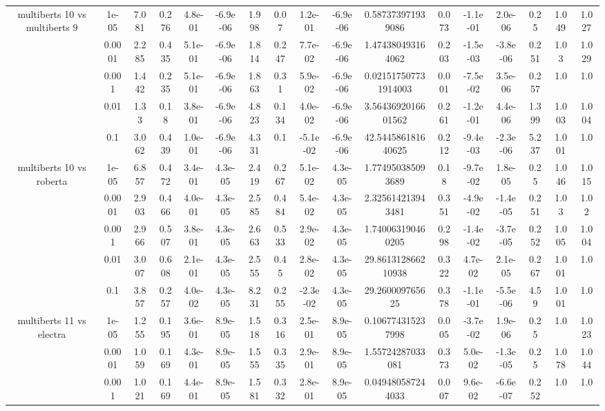 \begin{tabular}{|c|c|c|c|c|c|c|c|c|c|c|c|c|c|c|c|c|}
\hline
\multirow{5}{*}{multiberts 10 vs multiberts 9} & 1e-05 & 7.081 & 0.276 & 4.8e-01 & -6.9e-06 & 1.998 & 0.07 & 1.2e-01 & -6.9e-06 & 0.587373971939086 & 0.073 & -1.1e-01 & 2.0e-06 & 0.25 & 1.049 & 1.027 \\
 & 0.0001 & 2.285 & 0.435 & 5.1e-01 & -6.9e-06 & 1.814 & 0.247 & 7.7e-02 & -6.9e-06 & 1.474380493164062 & 0.203 & -1.5e-03 & -3.8e-06 & 0.251 & 1.03 & 1.029 \\
 & 0.001 & 1.442 & 0.235 & 5.1e-01 & -6.9e-06 & 1.863 & 0.31 & 5.9e-02 & -6.9e-06 & 0.021517507731914003 & 0.001 & -7.5e-02 & 3.5e-06 & 0.257 & 1.0 & 1.0 \\
 & 0.01 & 1.33 & 0.18 & 3.8e-01 & -6.9e-06 & 4.823 & 0.134 & 4.0e-02 & -6.9e-06 & 3.5643692016601562 & 0.261 & -1.2e-01 & 4.4e-06 & 1.399 & 1.003 & 1.004 \\
 & 0.1 & 3.062 & 0.439 & 1.0e-01 & -6.9e-06 & 4.331 & 0.1 & -5.1e-02 & -6.9e-06 & 42.544586181640625 & 0.212 & -9.4e-03 & -2.3e-06 & 5.237 & 1.001 & 1.0 \\
\hline
\multirow{5}{*}{multiberts 10 vs roberta } & 1e-05 & 6.857 & 0.472 & 3.4e-01 & 4.3e-05 & 2.419 & 0.267 & 5.1e-02 & 4.3e-05 & 1.774950385093689 & 0.18 & -9.7e-02 & 1.8e-05 & 0.25 & 1.046 & 1.015 \\
 & 0.0001 & 2.903 & 0.466 & 4.0e-01 & 4.3e-05 & 2.585 & 0.484 & 5.4e-02 & 4.3e-05 & 2.325614213943481 & 0.351 & -4.9e-02 & -1.4e-05 & 0.251 & 1.03 & 1.02 \\
 & 0.001 & 2.966 & 0.507 & 3.8e-01 & 4.3e-05 & 2.663 & 0.533 & 2.9e-02 & 4.3e-05 & 1.740063190460205 & 0.298 & -1.4e-02 & -3.7e-05 & 0.252 & 1.005 & 1.004 \\
 & 0.01 & 3.007 & 0.608 & 2.1e-01 & 4.3e-05 & 2.555 & 0.45 & 2.8e-02 & 4.3e-05 & 29.861312866210938 & 0.322 & 4.7e-02 & 2.1e-05 & 0.267 & 1.001 & 1.0 \\
 & 0.1 & 3.857 & 0.257 & 4.0e-02 & 4.3e-05 & 8.231 & 0.255 & -2.3e-02 & 4.3e-05 & 29.260009765625 & 0.378 & -1.1e-01 & -5.5e-06 & 4.59 & 1.001 & 1.0 \\
\hline
\multirow{5}{*}{multiberts 11 vs electra } & 1e-05 & 1.255 & 0.195 & 3.6e-01 & 8.9e-05 & 1.518 & 0.316 & 2.5e-01 & 8.9e-05 & 0.106774315237998 & 0.005 & -3.7e-02 & 1.9e-06 & 0.25 & 1.0 & 1.023 \\
 & 0.0001 & 1.059 & 0.169 & 4.3e-01 & 8.9e-05 & 1.555 & 0.335 & 2.9e-01 & 8.9e-05 & 1.55724287033081 & 0.373 & 5.0e-02 & -1.3e-05 & 0.25 & 1.078 & 1.044 \\
 & 0.001 & 1.021 & 0.169 & 4.4e-01 & 8.9e-05 & 1.581 & 0.332 & 2.8e-01 & 8.9e-05 & 0.049480587244033 & 0.007 & 9.6e-02 & -6.6e-07 & 0.252 & 1.0 & 1.0 \\

\end{tabular}
